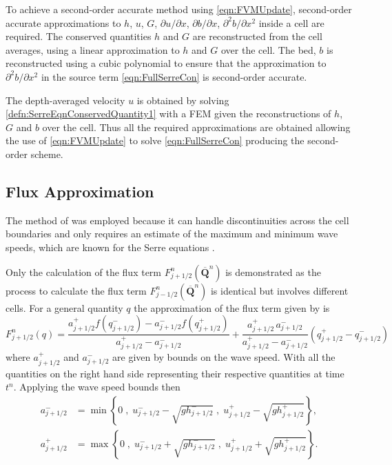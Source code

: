 \documentclass[times]{elsarticle}
\newcommand{\vecn}[1]{\boldsymbol{#1}}
\begin{document}
To achieve a second-order accurate method using \eqref{eqn:FVMUpdate}, second-order accurate approximations to $h$, $u$, $G$, $\partial u / \partial x$, $\partial b / \partial x$, $\partial^2 b / \partial x^2$ inside a cell are required. The conserved quantities $h$ and $G$ are reconstructed from the cell averages, using a linear approximation to $h$ and $G$ over the cell. The bed, $b$ is reconstructed using a cubic polynomial to ensure that the approximation to $\partial^2 b / \partial x^2$ in the source term \eqref{eqn:FullSerreCon} is second-order accurate. 

The depth-averaged velocity $u$ is obtained by solving \eqref{defn:SerreEqnConservedQuantity1} with a FEM given the reconstructions of $h$, $G$ and $b$ over the cell. Thus all the required approximations are obtained allowing the use of \eqref{eqn:FVMUpdate} to solve \eqref{eqn:FullSerreCon} producing the second-order scheme.

\subsection{Flux Approximation}
The method of \citet{Kurganov-etal-2001-707} was employed because it can handle discontinuities across the cell boundaries and only requires an estimate of the maximum and minimum wave speeds, which are known for the Serre equations \cite{Zoppou-etal-2017}.

Only the calculation of the flux term $F^n_{j+1/2}\left(\overline{\vecn{Q} }^{n} \right)$ is demonstrated as the process to calculate the flux term $F^n_{j-1/2}\left(\overline{\vecn{Q} }^{n} \right)$ is identical but involves different cells. For a general quantity $q$ the approximation of the flux term given by \citet{Kurganov-etal-2001-707} is
\begin{equation}\label{eqn:HLL_flux}
F^n_{j+1/2}(q) = \dfrac{a^+_{j+1/2} f\left(q^-_{j+1/2}\right) - a^-_{j+1/2} f\left(q^+_{j+1/2}\right)}{a^+_{j+1/2} - a^-_{j+1/2}}  + \dfrac{a^+_{j+1/2} \, a^-_{j+1/2}}{a^+_{j+1/2} - a^-_{j+1/2}} \left(  q^+_{j+1/2} - q^-_{j+1/2} \right)
\end{equation}
where $a^+_{j+1/2}$ and $a^-_{j+1/2}$ are given by bounds on the wave speed. With all the quantities on the right hand side representing their respective quantities at time $t^n$. Applying the wave speed bounds \cite{Zoppou-etal-2017} then
\begin{subequations}
\begin{align}
a^-_{j+{1}/{2}} &= \min\left\lbrace 0\;,\;  u^-_{j + 1/2} - \sqrt{g  {h}^-_{j + 1/2}}  \;,\;u^+_{j + 1/2} - \sqrt{g  {h}^+_{j + 1/2}} \right\rbrace  ,\\
a^+_{j+1/2} &= \max\left\lbrace 0 \;,\;  u^-_{j + 1/2} + \sqrt{g {h}^-_{j + 1/2}}  \;,\;u^+_{j + 1/2} + \sqrt{g  {h}^+_{j + 1/2}} \right\rbrace .
\end{align}
\label{eqn:WaveSpeedBoundsFluxApprox}
\end{subequations}
\end{document}
